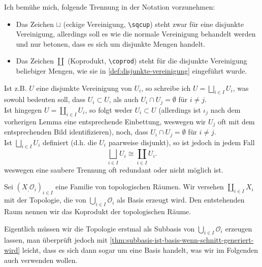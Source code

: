 \begin{notation**}
    Ich bemühe mich, folgende Trennung in der Notation vorzunehmen:
    \begin{itemize}
        \item Das Zeichen $\sqcup$ (eckige Vereinigung, \verb?\sqcup?) steht zwar für eine disjunkte Vereinigung, allerdings soll es wie die normale Vereinigung behandelt werden und nur betonen, dass es sich um disjunkte Mengen handelt.
        \item Das Zeichen  $\coprod$ (Koprodukt, \verb?\coprod?) steht für die disjunkte Vereinigung beliebiger Mengen, wie sie in \autoref{def:disjunkte-vereinigung} eingeführt wurde.
    \end{itemize}
    Ist z.B. $U$ eine disjunkte Vereinigung von  $U_i$, so schreibe ich  $U = \bigsqcup_{i \in I} U_i$, was sowohl bedeuten soll, dass  $U_i \subset U$, als auch $U_i \cap  U_j = \emptyset$ für $i\neq j$. \\
    Ist hingegen $U = \coprod_{i \in I} U_i$, so folgt weder $U_i \subset U$ (allerdings ist $ι_j$ nach dem vorherigen Lemma eine entsprechende Einbettung, weswegen wir  $U_j$ oft mit dem entsprechenden Bild identifizieren), noch, dass  $U_i \cap  U_j = \emptyset$ für $i\neq j$. \\
    Ist $\bigsqcup_{i \in I}U_i$ definiert (d.h. die $U_i$ paarweise disjunkt), so ist jedoch in jedem Fall
    \[
    \bigsqcup_{i \in I} U_i \cong \coprod_{i \in I}U_i
    .\] 
    weswegen eine saubere Trennung oft redundant oder nicht möglich ist.
\end{notation**}

\begin{definition}\label{disjunkte-vereinigung-topologischer-räume}
    Sei $(X_,\mathcal{O}_i)_{i \in I}$ eine Familie von topologischen Räumen. Wir versehen $\coprod_{i \in I}X_i$ mit der Topologie, die von $\bigcup_{i \in I}\mathcal{O}_i$ als Basis erzeugt wird. Den entstehenden Raum nennen wir das Koprodukt der topologischen Räume.
\end{definition}
\begin{remark*}
    Eigentlich müssen wir die Topologie erstmal als Subbasis von $\bigcup_{i \in  I} \mathcal{O}_i$ erzeugen lassen, man überprüft jedoch mit \autoref{thm:subbasis-ist-basis-wenn-schnitt-generiert-wird} leicht, dass es sich dann sogar um eine Basis handelt, was wir im Folgenden auch verwenden wollen.
\end{remark*}

